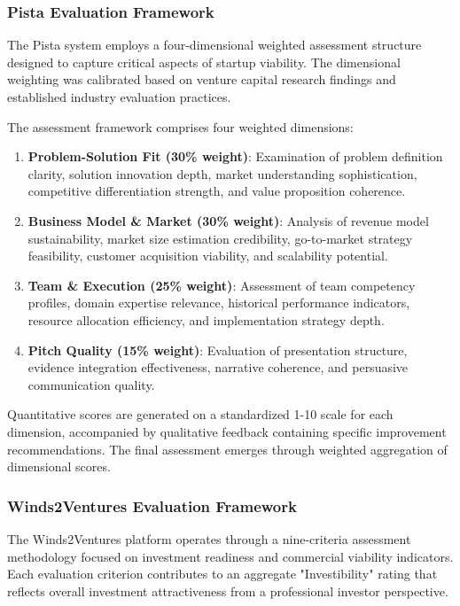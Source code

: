 \subsubsection{Pista Evaluation Framework}

The Pista system employs a four-dimensional weighted assessment structure designed to capture critical aspects of startup viability. The dimensional weighting was calibrated based on venture capital research findings and established industry evaluation practices.

The assessment framework comprises four weighted dimensions:
\begin{enumerate}
    \item \textbf{Problem-Solution Fit (30\% weight)}: Examination of problem definition clarity, solution innovation depth, market understanding sophistication, competitive differentiation strength, and value proposition coherence.

    \item \textbf{Business Model \& Market (30\% weight)}: Analysis of revenue model sustainability, market size estimation credibility, go-to-market strategy feasibility, customer acquisition viability, and scalability potential.

    \item \textbf{Team \& Execution (25\% weight)}: Assessment of team competency profiles, domain expertise relevance, historical performance indicators, resource allocation efficiency, and implementation strategy depth.

    \item \textbf{Pitch Quality (15\% weight)}: Evaluation of presentation structure, evidence integration effectiveness, narrative coherence, and persuasive communication quality.
\end{enumerate}

Quantitative scores are generated on a standardized 1-10 scale for each dimension, accompanied by qualitative feedback containing specific improvement recommendations. The final assessment emerges through weighted aggregation of dimensional scores.

\subsubsection{Winds2Ventures Evaluation Framework}

The Winds2Ventures platform operates through a nine-criteria assessment methodology focused on investment readiness and commercial viability indicators. Each evaluation criterion contributes to an aggregate "Investibility" rating that reflects overall investment attractiveness from a professional investor perspective.

